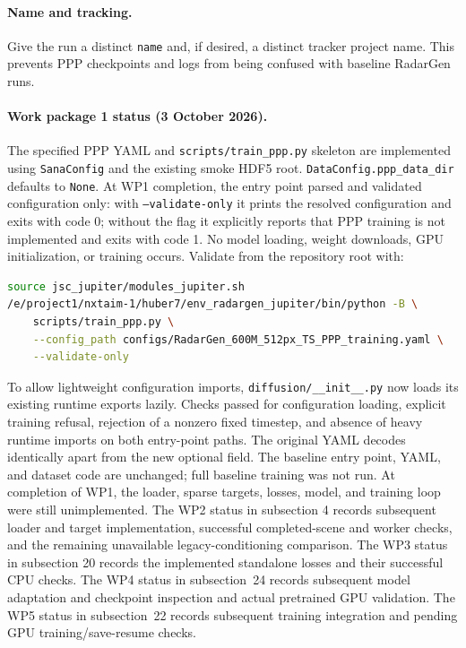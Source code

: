\documentclass[11pt,a4paper]{article}
\begin{document}
\paragraph{Name and tracking.}
Give the run a distinct \texttt{name} and, if desired, a distinct tracker project name. This prevents PPP checkpoints and logs from being confused with baseline RadarGen runs.

\paragraph{Work package 1 status (3 October 2026).}
The specified PPP YAML and \texttt{scripts/train\_ppp.py} skeleton are
implemented using \texttt{SanaConfig} and the existing smoke HDF5 root.
\texttt{DataConfig.ppp\_data\_dir} defaults to \texttt{None}.
At WP1 completion, the entry point parsed and validated configuration only: with
\texttt{--validate-only} it prints the resolved configuration and exits
with code 0; without the flag it explicitly reports that PPP training
is not implemented and exits with code 1. No model loading, weight
downloads, GPU initialization, or training occurs.
Validate from the repository root with:
\begin{lstlisting}[language=bash]
source jsc_jupiter/modules_jupiter.sh
/e/project1/nxtaim-1/huber7/env_radargen_jupiter/bin/python -B \
    scripts/train_ppp.py \
    --config_path configs/RadarGen_600M_512px_TS_PPP_training.yaml \
    --validate-only
\end{lstlisting}
To allow lightweight configuration imports, \texttt{diffusion/__init__.py}
now loads its existing runtime exports lazily. Checks passed for
configuration loading, explicit training refusal, rejection of a nonzero
fixed timestep, and absence of heavy runtime imports on both entry-point
paths. The original YAML decodes identically apart from the new optional
field. The baseline entry point, YAML, and dataset code are unchanged;
full baseline training was not run. At completion of WP1, the loader,
sparse targets, losses, model, and training loop were still unimplemented.
The WP2 status in subsection 4 records subsequent loader and target
implementation, successful completed-scene and worker checks, and
the remaining unavailable legacy-conditioning comparison.
The WP3 status in subsection 20 records the implemented standalone
losses and their successful CPU checks.
The WP4 status in subsection~24 records subsequent model adaptation and
checkpoint inspection and actual pretrained GPU validation. The WP5 status
in subsection~22 records subsequent training integration and pending GPU
training/save-resume checks.
\end{document}
